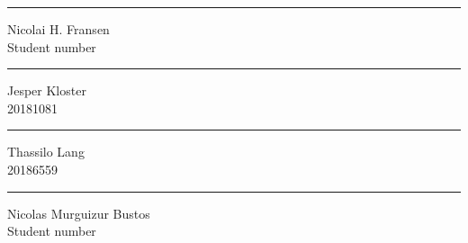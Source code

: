 \begin{titlingpage}
\begin{center}
\begin{minipage}{0.25\linewidth}
\end{minipage}
\hspace{10pt}
\vspace{20pt}
\begin{minipage}{0.25\linewidth}
	\centering
	\hrule
	\vspace{12pt}
	Nicolai H. Fransen\\
	Student number %
\end{minipage}
\hspace{10pt}
\begin{minipage}{0.25\linewidth}
	\centering
	\hrule
	\vspace{12pt}
	Jesper Kloster\\
	20181081 %
\end{minipage}
\hspace{10pt}
\begin{minipage}{0.25\linewidth}
	\centering
	\hrule
	\vspace{12pt}
	Thassilo Lang\\ %
	20186559 %
\end{minipage}
\hspace{10pt}
\vspace{20pt}
\begin{minipage}{0.25\linewidth}
	\centering
	\hrule
	\vspace{12pt}
	Nicolas Murguizur Bustos\\ %
	Student number %
\end{minipage}


\end{center}

\end{titlingpage}

\clearpage
\tableofcontents












\printbibliography

